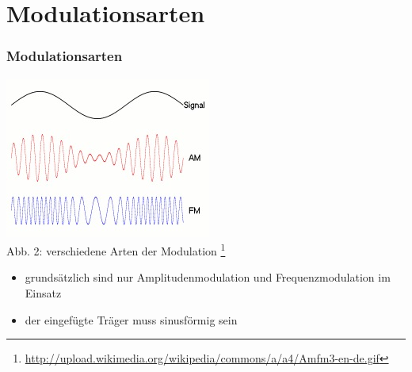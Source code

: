 \section*{Modulationsarten}
\begin{frame}
\frametitle{Modulationsarten}
\begin{center}
\includegraphics[scale=0.8]{e14/modulationen.jpg}\\
	Abb. 2: verschiedene Arten der Modulation
	\footnote{\url{http://upload.wikimedia.org/wikipedia/commons/a/a4/Amfm3-en-de.gif}}\\
	
\begin{itemize}
	\item grundsätzlich sind nur Amplitudenmodulation und Frequenzmodulation im Einsatz
	\item der eingefügte Träger muss sinusförmig sein
\end{itemize}
\end{center}
\end{frame}

